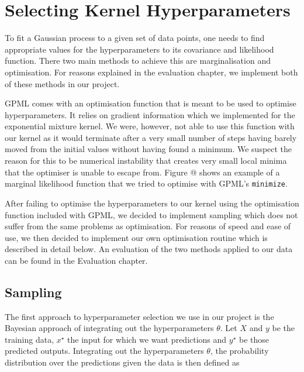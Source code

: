 \documentclass[a4paper,12pt,twoside,openright]{report}
\begin{document}
\section{Selecting Kernel Hyperparameters} 


To fit a Gaussian process to a given set of data points, one needs to find appropriate values for the hyperparameters to its covariance and likelihood function. There two main methods to achieve this are marginalisation and optimisation. For reasons explained in the evaluation chapter, we implement both of these methods in our project.

GPML comes with an optimisation function that is meant to be used to optimise hyperparameters. It relies on gradient information which we implemented for the exponential mixture kernel. We were, however, not able to use this function with our kernel as it would terminate after a very small number of steps having barely moved from the initial values without having found a minimum. We suspect the reason for this to be numerical instability that creates very small local minima that the optimiser is unable to escape from. Figure @ shows an example of a marginal likelihood function that we tried to optimise with GPML's \texttt{minimize}.

After failing to optimise the hyperparameters to our kernel using the optimisation function included with GPML, we decided to implement sampling which does not suffer from the same problems as optimisation. For reasons of speed and ease of use, we then decided to implement our own optimisation routine which is described in detail below. An evaluation of the two methods applied to our data can be found in the Evaluation chapter.

\subsection{Sampling}

The first approach to hyperparameter selection we use in our project is the Bayesian approach of integrating out the hyperparameters $\theta$. Let $X$ and $y$ be the training data, $x^\star$ the input for which we want predictions and $y^\star$ be those predicted outputs. Integrating out the hyperparameters $\theta$, the probability distribution over the predictions given the data is then defined as
\end{document}
